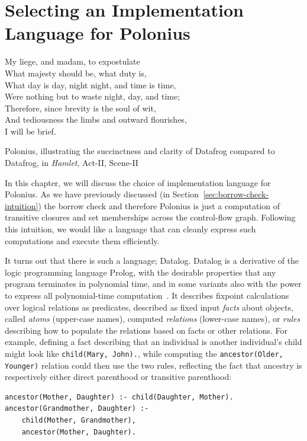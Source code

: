 \documentclass[11pt,a4paper,twoside,openany]{report}
\newcommand{\InDatalog}[1]{\texttt{#1}}
\begin{document}
\chapter{Selecting an Implementation Language for Polonius}\label{cha:datalog}

\epigraph{My liege, and madam, to expostulate\\
  What majesty should be, what duty is,\\
  What day is day, night night, and time is time,\\
  Were nothing but to waste night, day, and time;\\
  Therefore, since brevity is the soul of wit,\\
  And tediousness the limbs and outward flourishes,\\
  I will be brief.}{Polonius, illustrating the succinctness and clarity of
  Datafrog compared to Datafrog, in \textit{Hamlet}, Act-II, Scene-II}

In this chapter, we will discuss the choice of implementation language for
Polonius. As we have previously discussed (in
Section~\ref{sec:borrow-check-intuition}) the borrow check and therefore
Polonius is just a computation of transitive closures and set memberships across
the control-flow graph. Following this intuition, we would like a language that
can cleanly express such computations and execute them efficiently.

It turns out that there is such a language; Datalog. Datalog is a derivative of
the logic programming language Prolog, with the desirable properties that any
program terminates in polynomial time, and in some variants also with the power
to express all polynomial-time computation~\cite{afrati_datalog_1995}. It
describes fixpoint calculations over logical relations as predicates, described
as fixed input \emph{facts} about objects, called \emph{atoms} (upper-case
names), computed \emph{relations} (lower-case names), or \emph{rules} describing
how to populate the relations based on facts or other relations. For example,
defining a fact describing that an individual is another individual's child
might look like \InDatalog{child(Mary, John).}, while computing the
\InDatalog{ancestor(Older, Younger)} relation could then use the two rules,
reflecting the fact that ancestry is respectively either direct parenthood or
transitive parenthood:
\begin{verbatim}
ancestor(Mother, Daughter) :- child(Daughter, Mother).
ancestor(Grandmother, Daughter) :- 
    child(Mother, Grandmother),
    ancestor(Mother, Daughter).
\end{verbatim}
\end{document}
